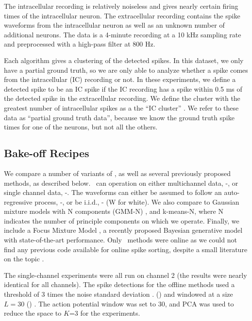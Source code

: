 The intracellular recording is relatively noiseless and gives nearly certain firing times of the intracellular neuron.  The extracellular recording contains the spike waveforms from the intracellular neuron as well as an unknown number of additional neurons.  The data is a 4-minute recording at a 10 kHz sampling rate and preprocessed with a high-pass filter at 800 Hz. 

Each algorithm gives a clustering of the detected spikes.  In this dataset, we only have a partial ground truth, so we are only able to analyze whether a spike comes from the intracellular (IC) recording or not.  In these experiments, we define a detected spike to be an IC spike if the IC recording has a spike within 0.5 ms  of the detected spike in the extracellular recording.  We define the cluster with the greatest number of intracellular spikes as a the ``IC cluster'' .   We refer to these data as ``partial ground truth data'', because we know the ground truth spike times for one of the neurons, but not all the others.  

\subsection{Bake-off Recipes}

We compare a number of variants of \smug, as well as several previously proposed methods, as described below.  \smug~can operation on either multichannel data, \smug-, or single channel data, \smug-.  The waveforms can either be assumed to follow an auto-regressive process, \smug-, or be i.i.d., \smug- (W for white).   We also compare to Gaussian mixture models with N components (GMM-N) , and k-means-N, where N indicates the number of principle components on which we operate.  Finally, we include a Focus Mixture Model \cite{??}, a recently proposed Bayesian generative model with state-of-the-art performance.  Only \smug~methods were online as we could not find any previous code available for online spike sorting, despite a small literature on the topic \cite{??}. 

% 
% 
The single-channel experiments were all run on channel 2 (the results were nearly identical for all channels).  The spike detections for the offline methods used a threshold of 3 times the noise standard deviation \cite{Lewicki}. () and windowed at a size $L=30$ () .  The action potential window was set to 30, and PCA was used to reduce the space to $K$=3 for the experiments. 

